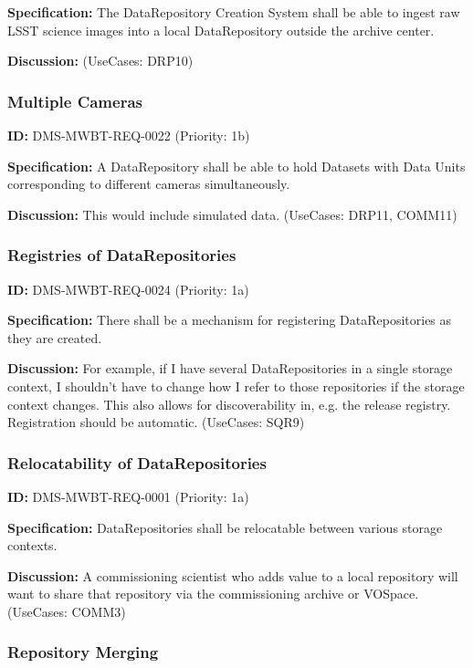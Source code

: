 \documentclass[SE,toc,lsstdraft]{lsstdoc}
\begin{document}
\textbf{Specification:}
The DataRepository Creation System shall be able to ingest raw LSST science images into a local DataRepository outside the archive center.

\textbf{Discussion:}
(UseCases: DRP10)

\subsubsection{Multiple Cameras}

\label{DMS-MWBT-REQ-0022}
\textbf{ID:} DMS-MWBT-REQ-0022 (Priority: 1b)

\textbf{Specification:}
A DataRepository shall be able to hold Datasets with Data Units corresponding to different cameras simultaneously.

\textbf{Discussion:}
This would include simulated data. (UseCases: DRP11, COMM11)

\subsubsection{Registries of DataRepositories}

\label{DMS-MWBT-REQ-0024}
\textbf{ID:} DMS-MWBT-REQ-0024 (Priority: 1a)

\textbf{Specification:}
There shall be a mechanism for registering DataRepositories as they are created.

\textbf{Discussion:}
For example, if I have several DataRepositories in a single storage context, I shouldn't have to change how I refer to those repositories if the storage context changes. This also allows for discoverability in, e.g. the release registry. Registration should be automatic. (UseCases: SQR9)

\subsubsection{Relocatability of DataRepositories}

\label{DMS-MWBT-REQ-0001}
\textbf{ID:} DMS-MWBT-REQ-0001 (Priority: 1a)

\textbf{Specification:}
DataRepositories shall be relocatable between various storage contexts.

\textbf{Discussion:}
A commissioning scientist who adds value to a local repository will want to share that repository via the commissioning archive or VOSpace. (UseCases: COMM3)

\subsubsection{Repository Merging}
\end{document}
